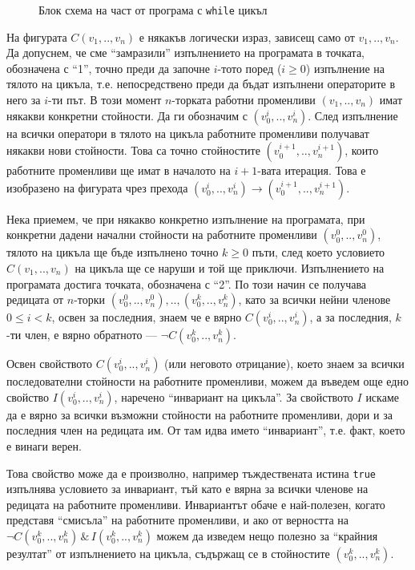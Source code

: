 \documentclass[12pt,a4paper]{article}
\newcommand{\code}[1]{\texttt{#1}}
\begin{document}
{\begin{figure}
  \caption{Блок схема на част от програма с \code{while} цикъл}
  \label{fig:1while}
\end{figure}


\begin{mdframed}[hidealllines=true,backgroundcolor=gray!20]
На фигурата $C(v_1,..,v_n)$ е някакъв логически израз, зависещ само от $v_1,..,v_n$. Да допуснем, че сме ``замразили'' изпълнението на програмата в точката, обозначена с ``1'', точно преди да започне $i$-тото поред ($i\geq 0$) изпълнение на тялото на цикъла, т.е. непосредствено преди да бъдат изпълнени операторите в него за $i$-ти път. В този момент $n$-торката работни променливи $(v_1,..,v_n)$ имат някакви конкретни стойности. Да ги обозначим с $(v_0^{i},..,v_n^{i})$. След изпълнение на всички оператори в тялото на цикъла работните променливи получават някакви нови стойности. Това са точно стойностите $(v_0^{i+1},..,v_n^{i+1})$, които работните променливи ще имат в началото на $i+1$-вата итерация. Това е изобразено на фигурата чрез прехода $(v_0^i,..,v_n^i) \rightarrow (v_0^{i+1},..,v_n^{i+1})$.

Нека приемем, че при някакво конкретно изпълнение на програмата, при конкретни дадени начални стойности на работните променливи  $(v_0^{0},..,v_n^{0})$, тялото на цикъла ще бъде изпълнено точно  $k\geq 0$ пъти, след което условието $C(v_1,..,v_n)$ на цикъла ще се наруши и той ще приключи. Изпълнението на програмата достига точката, обозначена с ``2''. По този начин се получава редицата от $n$-торки $(v_0^{0},..,v_n^{0}),..,(v_0^{k},..,v_n^{k})$, като за всички нейни членове $0\leq i < k$, освен за последния, знаем че е вярно $C(v_0^{i},..,v_n^{i})$, а за последния, $k$-ти член, е вярно обратното --- $\neg C(v_0^{k},..,v_n^{k})$.

Освен свойството $C(v_0^{i},..,v_n^{i})$ (или неговото отрицание), което знаем за всички последователни стойности на работните променливи, можем да въведем още едно свойство $I(v_0^{i},..,v_n^{i})$, наречено ``инвариант на цикъла''. За свойството $I$ искаме да е вярно за всички възможни стойности на работните променливи, дори и за последния член на редицата им. От там идва името ``инвариант'', т.е. факт, което е винаги верен.

Това свойство може да е произволно, например тъждествената истина \code{true} изпълнява условието за инвариант, тъй като е вярна за всички членове на редицата на работните променливи. Инвариантът обаче е най-полезен, когато представя ``смисъла'' на работните променливи, и ако от верността на $\neg C(v_0^{k},..,v_n^{k})\,\&\, I(v_0^{k},..,v_n^{k})$ можем да изведем нещо полезно за ``крайния резултат'' от изпълнението на цикъла, съдържащ се в стойностите $(v_0^{k},..,v_n^{k})$.
\end{mdframed}

}
\end{document}
